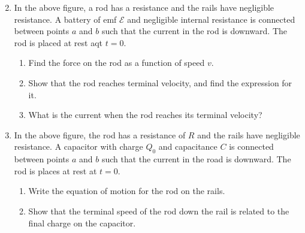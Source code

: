 \documentclass{../../oss-apphys}
\begin{document}
\begin{center}
\end{center}

\begin{enumerate}[leftmargin=18pt]
  \setcounter{enumi}{1}
\item In the above figure, a rod has a resistance and the rails have negligible
  resistance. A battery of emf $\mathcal{E}$ and negligible internal resistance
  is connected between points $a$ and $b$ such that the current in the rod is
  downward. The rod is placed at rest aqt $t=0$.
  \begin{enumerate}[noitemsep]
  \item Find the force on the rod as a function of speed $v$.
  \item Show that the rod reaches terminal velocity, and find the expression for
    it.
  \item What is the current when the rod reaches its terminal velocity?
  \end{enumerate}
  \vspace{2in}
  
\item In the above figure, the rod has a resistance of $R$ and the rails have
  negligible resistance. A capacitor with charge $Q_0$ and capacitance $C$ is
  connected between points $a$ and $b$ such that the current in the road is
  downward. The rod is places at rest at $t=0$.
  \begin{enumerate}[noitemsep]
  \item Write the equation of motion for the rod on the rails.
  \item Show that the terminal speed of the rod down the rail is related to the
    final charge on the capacitor.
  \end{enumerate}
\end{enumerate}
\newpage
\begin{center}
\end{center}
\end{document}
